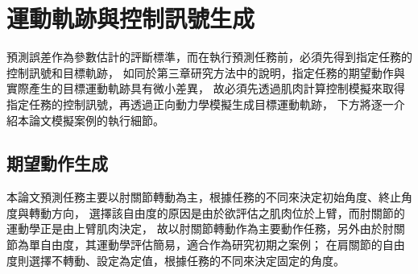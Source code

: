 \section{運動軌跡與控制訊號生成}
預測誤差作為參數估計的評斷標準，而在執行預測任務前，必須先得到指定任務的控制訊號和目標軌跡，
如同於第三章研究方法中的說明，指定任務的期望動作與實際產生的目標運動軌跡具有微小差異，
故必須先透過肌肉計算控制模擬來取得指定任務的控制訊號，再透過正向動力學模擬生成目標運動軌跡，
下方將逐一介紹本論文模擬案例的執行細節。

\subsection{期望動作生成}
本論文預測任務主要以肘關節轉動為主，根據任務的不同來決定初始角度、終止角度與轉動方向，
選擇該自由度的原因是由於欲評估之肌肉位於上臂，而肘關節的運動學正是由上臂肌肉決定，
故以肘關節轉動作為主要動作任務，另外由於肘關節為單自由度，其運動學評估簡易，適合作為研究初期之案例；
在肩關節的自由度則選擇不轉動、設定為定值，根據任務的不同來決定固定的角度。

